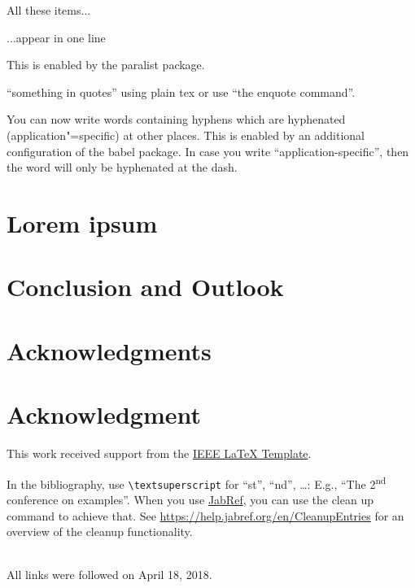 \documentclass[conference]{IEEEtran}[2015/08/26]
\begin{document}
\begin{inparaenum}
  \item All these items...
  \item ...appear in one line
  \item This is enabled by the paralist package.
\end{inparaenum}

``something in quotes'' using plain tex or use \enquote{the enquote command}.

You can now write words containing hyphens which are hyphenated (application"=specific) at other places.
This is enabled by an additional configuration of the babel package.
In case you write \enquote{application-specific}, then the word will only be hyphenated at the dash.

\section{Lorem ipsum}
\label{sec:loremipsum}
\lipsum[1-4]

\section{Conclusion and Outlook}
\label{sec:outlook}

\blindtext

\ifCLASSOPTIONcompsoc
  \section*{Acknowledgments}
\else
  \section*{Acknowledgment}
\fi

This work received support from the \href{https://latextemplates.github.io/IEEE/}{IEEE LaTeX Template}.


In the bibliography, use \texttt{\textbackslash textsuperscript} for ``st'', ``nd'', \ldots:
E.g., \enquote{The 2\textsuperscript{nd} conference on examples}.
When you use \href{https://www.jabref.org}{JabRef}, you can use the clean up command to achieve that.
See \url{https://help.jabref.org/en/CleanupEntries} for an overview of the cleanup functionality.





\ \\ %
All links were followed on April 18, 2018.
\end{document}
